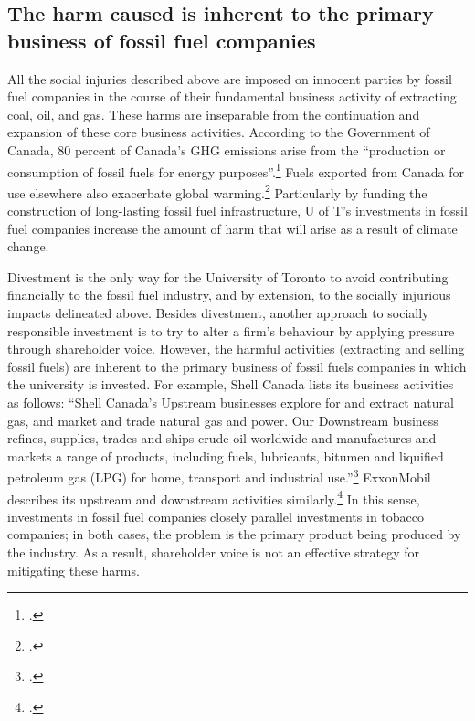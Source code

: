 \documentclass[10pt]{article}
\begin{document}
	\subsection{The harm caused is inherent to the primary business of fossil fuel companies}



All the social injuries described above are imposed on innocent parties by fossil fuel companies in the course of their fundamental business activity of extracting coal, oil, and gas.
These harms are inseparable from the continuation and expansion of these core business activities.
According to the Government of Canada, 80 percent of Canada's GHG emissions arise from the ``production or consumption of fossil fuels for energy purposes''.\footcite[][]{GoConGHGs}
Fuels exported from Canada for use elsewhere also exacerbate global warming.\footcite[The coal exported annually from the Westshore terminal near Vancouver ships 21 million metric tons of coal annually, which in turn produces GHG emissions equivalent to 5\% of Canada's total.][]{Sightline2011}
Particularly by funding the construction of long-lasting fossil fuel infrastructure, U of T's investments in fossil fuel companies increase the amount of harm that will arise as a result of climate change.



Divestment is the only way for the University of Toronto to avoid contributing financially to the fossil fuel industry, and by extension, to the socially injurious impacts delineated above.
Besides divestment, another approach to socially responsible investment is to try to alter a firm’s behaviour by applying pressure through shareholder voice. 
However, the harmful activities (extracting and selling fossil fuels) are inherent to the primary business of fossil fuels companies in which the university is invested.
For example, Shell Canada lists its business activities as follows: ``Shell Canada's Upstream businesses explore for and extract natural gas, and market and trade natural gas and power. Our Downstream business refines, supplies, trades and ships crude oil worldwide and manufactures and markets a range of products, including fuels, lubricants, bitumen and liquified petroleum gas (LPG) for home, transport and industrial use.''\footcite[][]{ShellAtAGlance}
ExxonMobil describes its upstream and downstream activities similarly.\footcite[][]{ExxonWhatWeDo}
In this sense, investments in fossil fuel companies closely parallel investments in tobacco companies; in both cases, the problem is the primary product being produced by the industry.
As a result, shareholder voice is not an effective strategy for mitigating these harms.
\end{document}
